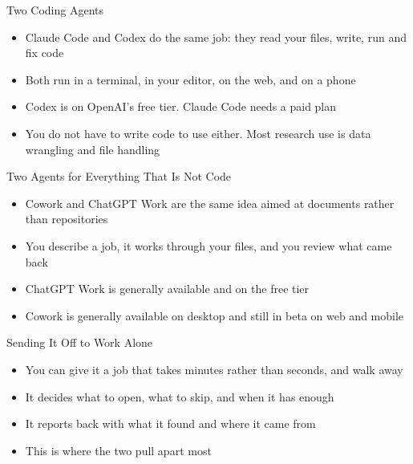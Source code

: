\documentclass[aspectratio=169]{beamer}
\begin{document}
\begin{frame}{Two Coding Agents}
    \begin{itemize}
        \item Claude Code and Codex do the same job: they read your files, write, run and
              fix code
        \item Both run in a terminal, in your editor, on the web, and on a phone
        \item Codex is on OpenAI's free tier. Claude Code needs a paid plan
        \item You do not have to write code to use either. Most research use is data
              wrangling and file handling
    \end{itemize}
\end{frame}

\begin{frame}{Two Agents for Everything That Is Not Code}
    \begin{itemize}
        \item Cowork and ChatGPT Work are the same idea aimed at documents rather than
              repositories
        \item You describe a job, it works through your files, and you review what came back
        \item ChatGPT Work is generally available and on the free tier
        \item Cowork is generally available on desktop and still in beta on web and mobile
    \end{itemize}
\end{frame}

\begin{frame}{Sending It Off to Work Alone}
    \begin{itemize}
        \item You can give it a job that takes minutes rather than seconds, and walk away
        \item It decides what to open, what to skip, and when it has enough
        \item It reports back with what it found and where it came from
        \item This is where the two pull apart most
    \end{itemize}
\end{frame}
\end{document}
